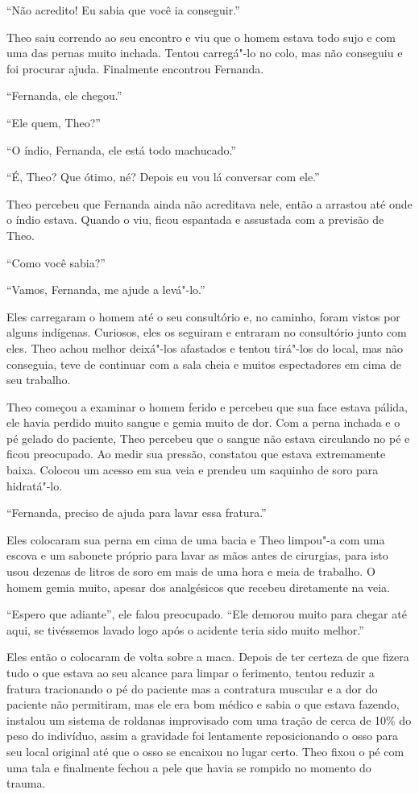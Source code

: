 ``Não acredito! Eu sabia que você ia conseguir.''

Theo saiu correndo ao seu encontro e viu que o homem estava todo sujo e
com uma das pernas muito inchada. Tentou carregá"-lo no colo, mas não
conseguiu e foi procurar ajuda. Finalmente encontrou Fernanda.

``Fernanda, ele chegou.''

``Ele quem, Theo?''

``O índio, Fernanda, ele está todo machucado.''

``É, Theo? Que ótimo, né? Depois eu vou lá conversar com ele.''

Theo percebeu que Fernanda ainda não acreditava nele, então a arrastou
até onde o índio estava. Quando o viu, ficou espantada e assustada com a
previsão de Theo.

``Como você sabia?''

``Vamos, Fernanda, me ajude a levá"-lo.''

Eles carregaram o homem até o seu consultório e, no caminho, foram
vistos por alguns indígenas. Curiosos, eles os seguiram e entraram no
consultório junto com eles. Theo achou melhor deixá"-los afastados e
tentou tirá"-los do local, mas não conseguia, teve de continuar com a
sala cheia e muitos espectadores em cima de seu trabalho.

Theo começou a examinar o homem ferido e percebeu que sua face estava
pálida, ele havia perdido muito sangue e gemia muito de dor. Com a perna
inchada e o pé gelado do paciente, Theo percebeu que o sangue não estava
circulando no pé e ficou preocupado. Ao medir sua pressão, constatou que
estava extremamente baixa. Colocou um acesso em sua veia e prendeu um
saquinho de soro para hidratá"-lo.

``Fernanda, preciso de ajuda para lavar essa fratura.''

Eles colocaram sua perna em cima de uma bacia e Theo limpou"-a com uma
escova e um sabonete próprio para lavar as mãos antes de cirurgias, para
isto usou dezenas de litros de soro em mais de uma hora e meia de
trabalho. O homem gemia muito, apesar dos analgésicos que recebeu
diretamente na veia.

``Espero que adiante'', ele falou preocupado. ``Ele demorou muito para
chegar até aqui, se tivéssemos lavado logo após o acidente teria sido
muito melhor.''

Eles então o colocaram de volta sobre a maca. Depois de ter certeza de
que fizera tudo o que estava ao seu alcance para limpar o ferimento,
tentou reduzir a fratura tracionando o pé do paciente mas a contratura
muscular e a dor do paciente não permitiram, mas ele era bom médico e
sabia o que estava fazendo, instalou um sistema de roldanas improvisado
com uma tração de cerca de 10\% do peso do indivíduo, assim a gravidade
foi lentamente reposicionando o osso para seu local original até que o
osso se encaixou no lugar certo. Theo fixou o pé com uma tala e
finalmente fechou a pele que havia se rompido no momento do trauma.

